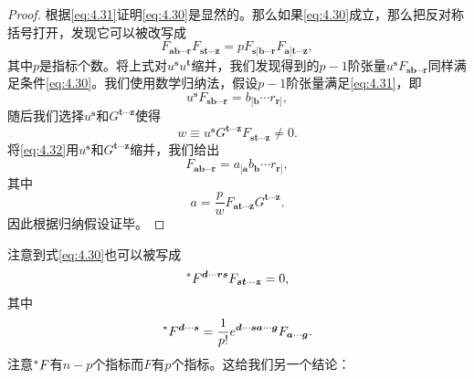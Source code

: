 \begin{proof}
	根据\ref{eq:4.31}证明\ref{eq:4.30}是显然的。那么如果\ref{eq:4.30}成立，那么把反对称括号打开，发现它可以被改写成
	\begin{equation}
		F_{\boldsymbol{ab} \cdots \boldsymbol{r}} F_{\boldsymbol{st} \cdots \boldsymbol{z}} =pF_{\boldsymbol{s}[\boldsymbol{b} \cdots \boldsymbol{r}} F_{\boldsymbol{a}]\boldsymbol{t} \cdots \boldsymbol{z}} ,
		\label{eq:4.32}
	\end{equation}
	其中$p$是指标个数。将上式对$u^{\boldsymbol{s}} u^{\boldsymbol{t}}$缩并，我们发现得到的$p-1$阶张量$u^{\boldsymbol{s}} F_{\boldsymbol{sb} \cdots \boldsymbol{r}}$同样满足条件\ref{eq:4.30}。我们使用数学归纳法，假设$p-1$阶张量满足\ref{eq:4.31}，即
	\begin{equation*}
		u^{\boldsymbol{s}} F_{\boldsymbol{sb} \cdots \boldsymbol{r}} =b_{[\boldsymbol{b}} \cdots r_{\boldsymbol{r}]} ,
	\end{equation*}
	随后我们选择$u^{\boldsymbol{s}}$和$G^{\boldsymbol{t} \cdots \boldsymbol{z}}$使得
	\begin{equation*}
		w\equiv u^{\boldsymbol{s}} G^{\boldsymbol{t} \cdots \boldsymbol{z}} F_{\boldsymbol{st} \cdots \boldsymbol{z}} \neq 0.
	\end{equation*}
	将\ref{eq:4.32}用$u^{\boldsymbol{s}}$和$G^{\boldsymbol{t} \cdots \boldsymbol{z}}$缩并，我们给出
	\begin{equation*}
		F_{\boldsymbol{ab} \cdots \boldsymbol{r}} =a_{[\boldsymbol{a}} b_{\boldsymbol{b}} \cdots r_{\boldsymbol{r}]} ,
	\end{equation*}
	其中
	\begin{equation*}
		a=\frac{p}{w} F_{\boldsymbol{at} \cdots \boldsymbol{z}} G^{\boldsymbol{t} \cdots \boldsymbol{z}} .
	\end{equation*}
	因此根据归纳假设证毕。
\end{proof}

注意到式\ref{eq:4.30}也可以被写成
\begin{equation}
	\prescript{*}{}{} F^{\boldsymbol{d} \cdots \boldsymbol{rs}} F_{\boldsymbol{st} \cdots \boldsymbol{z}} =0,
	\label{eq:4.33}
\end{equation}
其中
\begin{equation*}
	\prescript{*}{}{} F^{\boldsymbol{d} \cdots \boldsymbol{s}} =\frac{1}{p!} e^{\boldsymbol{d} \cdots \boldsymbol{sa} \cdots \boldsymbol{g}} F_{\boldsymbol{a} \cdots \boldsymbol{g}} .
\end{equation*}
注意$\prescript{*}{}{} F$有$n-p$个指标而$F$有$p$个指标。这给我们另一个结论：

